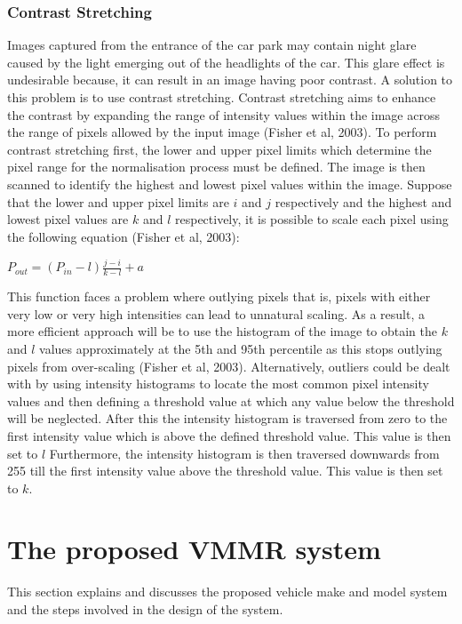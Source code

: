 \documentclass[a4paper, 12pt]{article}
\begin{document}
\subsubsection{Contrast Stretching}
Images captured from the entrance of the car park may contain night glare caused by the light emerging out of the headlights of the car. This glare effect is undesirable because, it can result in an image having poor contrast. A solution to this problem is to use contrast stretching. Contrast stretching aims to enhance the contrast by expanding the range of intensity values within the image across the range of pixels allowed by the input image (Fisher et al, 2003). To perform contrast stretching first, the lower and upper pixel limits which determine the pixel range for the normalisation process must be defined. The image is then scanned to identify the highest and lowest pixel values within the image. Suppose that the lower and upper pixel limits are $i$ and $j$ respectively and the highest and lowest pixel values are $k$ and $l$ respectively, it is possible to scale each pixel using the following equation (Fisher et al, 2003): 

\begin{center}
$P_{out} = (P_{in}-l)\frac{j-i}{k-l} + a$
\end{center}

This function faces a problem where outlying pixels that is, pixels with either very low or very high intensities can lead to unnatural scaling. As a result, a more efficient approach will be to use the histogram of the image to obtain the $k$ and $l$ values approximately at the 5th and 95th percentile as this stops outlying pixels from over-scaling (Fisher et al, 2003). Alternatively, outliers could be dealt with by using intensity histograms to locate the most common pixel intensity values and then defining a threshold value at which any value below the threshold will be neglected. After this the intensity histogram is traversed from zero to the first intensity value which is above the defined threshold value. This value is then set to $l$ Furthermore, the  intensity histogram is then traversed downwards from 255 till the first intensity value above the threshold value. This value is then set to $k$.

\section{The proposed VMMR system}
This section explains and discusses the proposed vehicle make and model system and the steps involved in the design of the system.
\end{document}
